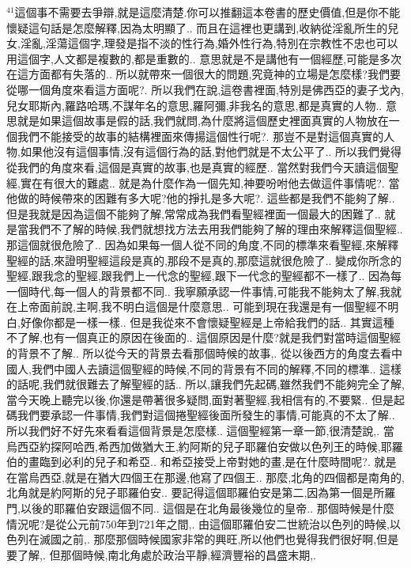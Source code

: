 \documentclass{book}
\begin{document}
$^{41}$這個事不需要去爭辯,就是這麼清楚.你可以推翻這本卷書的歷史價值,但是你不能懷疑這句話是怎麼解釋,因為太明顯了..
而且在這裡也更講到,收納從淫亂所生的兒女,淫亂,淫蕩這個字,理發是指不淡的性行為,婚外性行為,特別在宗教性不忠也可以用這個字,人文都是複數的,都是重數的..
意思就是不是講他有一個經歷,可能是多次在這方面都有失落的..
所以就帶來一個很大的問題,究竟神的立場是怎麼樣?我們要從哪一個角度來看這方面呢?.
所以我們在說,這卷書裡面,特別是佛西亞的妻子戈內,兒女耶斯內,羅路哈瑪,不謀年名的意思,羅阿彌,非我名的意思,都是真實的人物..
意思就是如果這個故事是假的話,我們就問,為什麼將這個歷史裡面真實的人物放在一個我們不能接受的故事的結構裡面來傳揚這個性行呢?.
那豈不是對這個真實的人物,如果他沒有這個事情,沒有這個行為的話,對他們就是不太公平了..
所以我們覺得從我們的角度來看,這個是真實的故事,也是真實的經歷..
當然對我們今天讀這個聖經,實在有很大的難處..
就是為什麼作為一個先知,神要吩咐他去做這件事情呢?.
當他做的時候帶來的困難有多大呢?他的掙扎是多大呢?.
這些都是我們不能夠了解..
但是我就是因為這個不能夠了解,常常成為我們看聖經裡面一個最大的困難了..
就是當我們不了解的時候,我們就想找方法去用我們能夠了解的理由來解釋這個聖經..
那這個就很危險了..
因為如果每一個人從不同的角度,不同的標準來看聖經,來解釋聖經的話,來證明聖經這段是真的,那段不是真的,那麼這就很危險了..
變成你所念的聖經,跟我念的聖經,跟我們上一代念的聖經,跟下一代念的聖經都不一樣了..
因為每一個時代,每一個人的背景都不同..
我寧願承認一件事情,可能我不能夠太了解,我就在上帝面前說,主啊,我不明白這個是什麼意思..
可能到現在我還是有一個聖經不明白,好像你都是一樣一樣..
但是我從來不會懷疑聖經是上帝給我們的話..
其實這種不了解,也有一個真正的原因在後面的..
這個原因是什麼?就是我們對當時這個聖經的背景不了解..
所以從今天的背景去看那個時候的故事,.
從以後西方的角度去看中國人,我們中國人去讀這個聖經的時候,不同的背景有不同的解釋,不同的標準..
這樣的話呢,我們就很難去了解聖經的話..
所以,讓我們先起碼,雖然我們不能夠完全了解,當今天晚上聽完以後,你還是帶著很多疑問,面對著聖經,我相信有的,不要緊..
但是起碼我們要承認一件事情,我們對這個捲聖經後面所發生的事情,可能真的不太了解..
所以我們好不好先來看看這個背景是怎麼樣..
這個聖經第一章一節,很清楚說,.
當烏西亞約探阿哈西,希西加做猶大王,約阿斯的兒子耶羅伯安做以色列王的時候,耶羅伯的畫臨到必利的兒子和希亞..
和希亞接受上帝對她的畫,是在什麼時間呢?.
就是在當烏西亞,就是在猶大四個王在那邊,他寫了四個王..
那麼,北角的四個都是南角的,北角就是約阿斯的兒子耶羅伯安..
要記得這個耶羅伯安是第二,因為第一個是所羅門,以後的耶羅伯安跟這個不同..
這個是在北角最後幾位的皇帝..
那個時候是什麼情況呢?是從公元前750年到721年之間,.
由這個耶羅伯安二世統治以色列的時候,以色列在滅國之前,.
那麼那個時候國家非常的興旺,所以他們也覺得我們很好啊,但是要了解,.
但那個時候,南北角處於政治平靜,經濟豐裕的昌盛末期,.
\end{document}
